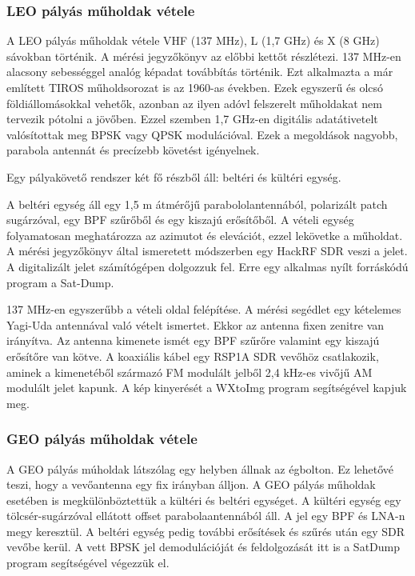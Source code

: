 \documentclass[a4paper,11pt]{article}
\begin{document}
\subsubsection*{LEO pályás műholdak vétele}

A LEO pályás műholdak vétele VHF (137 MHz), L (1,7 GHz) és X (8 GHz) sávokban történik. A mérési jegyzőkönyv az előbbi kettőt részlétezi.
137 MHz-en alacsony sebességgel analóg képadat továbbítás történik. Ezt alkalmazta a már említett TIROS műholdsorozat is az 1960-as években. Ezek egyszerű és olcsó földiállomásokkal vehetők, azonban az ilyen adóvl felszerelt műholdakat nem tervezik pótolni a jövőben.
Ezzel szemben 1,7 GHz-en digitális adatátivetelt valósítottak meg BPSK vagy QPSK modulációval. Ezek a megoldások nagyobb, parabola antennát és precízebb követést igényelnek.

Egy pályakövető rendszer két fő részből áll: beltéri és kültéri egység.

A beltéri egység áll egy 1,5 m átmérőjű parabololantennából, polarizált patch sugárzóval, egy BPF szűrőből és egy kiszajú erősítőből.
A vételi egység folyamatosan meghatározza az azimutot és elevációt, ezzel lekövetke a műholdat.
A mérési jegyzőkönyv által ismeretett módszerben egy HackRF SDR veszi a jelet. A digitalizált jelet számítógépen dolgozzuk fel. Erre egy alkalmas nyílt forráskódú program a Sat-Dump.

137 MHz-en egyszerűbb a vételi oldal felépítése. A mérési segédlet egy kételemes Yagi-Uda antennával való vételt ismertet. Ekkor az antenna fixen zenitre van irányítva. Az antenna kimenete ismét egy BPF szűrőre valamint
egy kiszajú erősítőre van kötve. A koaxiális kábel egy RSP1A SDR vevőhöz csatlakozik, aminek a kimenetéből származó FM modulált jelből 2,4 kHz-es vivőjű AM modulált jelet kapunk. A kép kinyerését a WXtoImg program segítségével kapjuk meg.

\subsubsection*{GEO pályás műholdak vétele}
A GEO pályás múholdak látszólag egy helyben állnak az égbolton. Ez lehetővé teszi, hogy a vevőantenna egy fix irányban álljon. A GEO pályás műholdak esetében is megkülönböztettük a kültéri és beltéri egységet. A kültéri egység egy tölcsér-sugárzóval ellátott offset parabolaantennából áll. A jel egy BPF és LNA-n megy keresztül. A beltéri egység pedig további erősítések és szűrés után egy SDR vevőbe kerül.
A vett BPSK jel demodulációját és feldolgozását itt is a SatDump program segítségével végezzük el.
\end{document}
